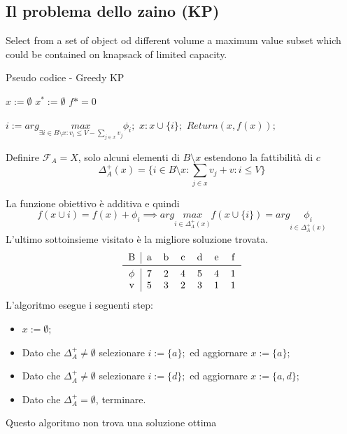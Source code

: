 \documentclass{article}
\begin{document}
    \subsection{Il problema dello zaino (KP)}
    Select from a set of object od different volume a maximum value subset which could be contained
    on knapsack of limited capacity.
    \begin{algorithm}[H]
        \caption{Pseudo codice - Greedy KP}
        \begin{algorithmic}
            \State $x:=\emptyset$
            \State $x^*:=\emptyset$
            \State $f*=0$

            \State $i:=arg\underset{\exists i \in B\setminus x :v_i\leq V-\sum_{j\in x}v_j}{max}\phi_i;$
            \State $x:x\cup\{i\};$
            \EndWhile
            \State $Return(x,f(x));$
        \end{algorithmic}
    \end{algorithm}
    Definire $\mathcal{F}_A = X$, solo alcuni elementi di $B\setminus x$ estendono la fattibilità di $c$
    $$\Delta_A^+(x)=\{i\in B\setminus x:\sum_{j\in x}v_j+v : i \leq V\}$$

    La funzione obiettivo è additiva e quindi
    $$f(x\cup{i})=f(x)+\phi_i\implies arg\underset{i\in\Delta_A^+(x)}{max}f(x\cup\{i\})=arg\underset{i\in\Delta_A^+(x)}{\phi_i}$$
    L'ultimo sottoinsieme visitato è la migliore soluzione trovata.
    \[
        \begin{tabular}{c | c c c c c c c}
            B      & a & b & c & d & e & f \\
            \midrule
            $\phi$ & 7 & 2 & 4 & 5 & 4 & 1 \\
            v      & 5 & 3 & 2 & 3 & 1 & 1 \\
        \end{tabular}
    \]
    L'algoritmo esegue i seguenti step:
    \begin{itemize}
        \item $x:=\emptyset;$
        \item Dato che $\Delta_A^+\neq\emptyset$ selezionare $i:=\{a\};$ ed aggiornare $x:=\{a\};$
        \item Dato che $\Delta_A^+\neq\emptyset$ selezionare $i:=\{d\};$ ed aggiornare $x:=\{a,d\};$
        \item Dato che $\Delta_A^+ = \emptyset$, terminare.
    \end{itemize}
    Questo algoritmo non trova una soluzione ottima
\end{document}
